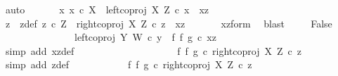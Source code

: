 \begin{isabellebody}
\ auto\isanewline
\ \isamarkupfalse%
\isanewline
\ \ \ \isamarkupfalse%
\ {\isachardoublequoteopen}{\isasymnexists}x{\isachardot}{\kern0pt}\ x\ {\isasymin}\isactrlsub c\ X\ {\isasymand}\ left{\isacharunderscore}{\kern0pt}coproj\ X\ Z\ {\isasymcirc}\isactrlsub c\ x\ {\isacharequal}{\kern0pt}\ xz{\isachardoublequoteclose}\isanewline
\ \ \ \isamarkupfalse%
\ \isamarkupfalse%
\ z\ \ z{\isacharunderscore}{\kern0pt}def{\isacharcolon}{\kern0pt}\ {\isachardoublequoteopen}z\ {\isasymin}\isactrlsub c\ Z\ {\isasymand}\ right{\isacharunderscore}{\kern0pt}coproj\ X\ Z\ {\isasymcirc}\isactrlsub c\ z\ {\isacharequal}{\kern0pt}\ xz{\isachardoublequoteclose}\isanewline
\ \ \ \ \ \isamarkupfalse%
\ xz{\isacharunderscore}{\kern0pt}form\ \isamarkupfalse%
\ blast\isanewline
\ \ \ \isamarkupfalse%
\ False\isanewline
\ \ \ \ \isamarkupfalse%
\ {\isacharminus}{\kern0pt}\ \isanewline
\ \ \ \ \ \ \isamarkupfalse%
\ {\isachardoublequoteopen}left{\isacharunderscore}{\kern0pt}coproj\ Y\ W\ {\isasymcirc}\isactrlsub c\ y\ {\isacharequal}{\kern0pt}\ {\isacharparenleft}{\kern0pt}f\ {\isasymbowtie}\isactrlsub f\ g{\isacharparenright}{\kern0pt}\ {\isasymcirc}\isactrlsub c\ xz{\isachardoublequoteclose}\isanewline
\ \ \ \ \ \ \ \ \isamarkupfalse%
\ {\isacharparenleft}{\kern0pt}simp\ add{\isacharcolon}{\kern0pt}\ xz{\isacharunderscore}{\kern0pt}def{\isacharparenright}{\kern0pt}\ \ \ \ \ \ \ \ \ \isanewline
\ \ \ \ \ \ \isamarkupfalse%
\ \isamarkupfalse%
\ {\isachardoublequoteopen}{\isachardot}{\kern0pt}{\isachardot}{\kern0pt}{\isachardot}{\kern0pt}\ {\isacharequal}{\kern0pt}\ {\isacharparenleft}{\kern0pt}f\ {\isasymbowtie}\isactrlsub f\ g{\isacharparenright}{\kern0pt}\ {\isasymcirc}\isactrlsub c\ right{\isacharunderscore}{\kern0pt}coproj\ X\ Z\ {\isasymcirc}\isactrlsub c\ z{\isachardoublequoteclose}\isanewline
\ \ \ \ \ \ \ \ \isamarkupfalse%
\ {\isacharparenleft}{\kern0pt}simp\ add{\isacharcolon}{\kern0pt}\ z{\isacharunderscore}{\kern0pt}def{\isacharparenright}{\kern0pt}\isanewline
\ \ \ \ \ \ \isamarkupfalse%
\ \isamarkupfalse%
\ {\isachardoublequoteopen}{\isachardot}{\kern0pt}{\isachardot}{\kern0pt}{\isachardot}{\kern0pt}\ {\isacharequal}{\kern0pt}\ {\isacharparenleft}{\kern0pt}{\isacharparenleft}{\kern0pt}f\ {\isasymbowtie}\isactrlsub f\ g{\isacharparenright}{\kern0pt}\ {\isasymcirc}\isactrlsub c\ right{\isacharunderscore}{\kern0pt}coproj\ X\ Z{\isacharparenright}{\kern0pt}\ {\isasymcirc}\isactrlsub c\ z{\isachardoublequoteclose}\isanewline

\end{isabellebody}
